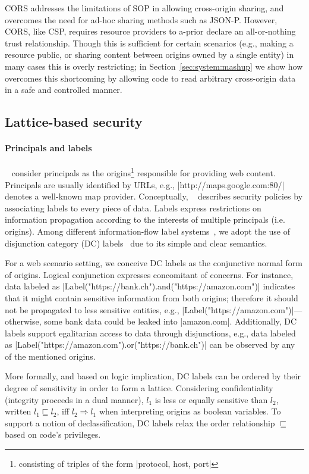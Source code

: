 CORS addresses the limitations of SOP in allowing cross-origin
sharing, and overcomes the need for ad-hoc sharing methods such as
JSON-P.
%
However, CORS, like CSP, requires resource providers to a-prior
declare an all-or-nothing trust relationship.
%
Though this is sufficient for certain scenarios (e.g., making a
resource public, or sharing content between origins owned by a single
entity) in many cases this is overly restricting;
%
in Section~\ref{sec:system:mashup} we show how \sys{} overcomes this
shortcoming by allowing code to read arbitrary cross-origin
data in a safe and controlled manner.


\subsection{Lattice-based security}

\paragraph{Principals and labels}

\sys~ consider principals as the origins\footnote{consisting of triples of the
  form \js|{protocol, host, port}|} responsible for providing web
content. Principals are usually identified by URLs, e.g., 
\js|http://maps.google.com:80/| denotes a well-known map provider.
Conceptually, \sys~ describes security policies by associating labels to every
piece of data. Labels express restrictions on information propagation according
to the interests of multiple principals (i.e. origins). Among different
information-flow label systems~\cite{GenLabels}, we adopt the use of disjunction
category (DC) labels~\cite{stefan:2011:dclabels} due to its simple and clear
semantics.

For a web scenario setting, we conceive DC labels as the conjunctive normal form
of origins. Logical conjunction expresses concomitant of concerns. For instance,
data labeled as \js|Label("https://bank.ch").and("https://amazon.com")|
indicates that it might contain sensitive information from both origins;
therefore it should not be propagated to less sensitive entities, e.g.,
\js|Label("https://amazon.com")|---otherwise, some bank data could be leaked
into \js|amazon.com|. Additionally, DC labels support egalitarian access to data
through disjunctions, e.g., data labeled as 
\js|Label("https://amazon.com").or("https://bank.ch")| can be
observed by any of the mentioned origins. 

More formally, and based on logic implication, DC labels can be ordered by their
degree of sensitivity in order to form a lattice. Considering confidentiality
(integrity proceeds in a dual manner), $l_1$ is less or equally sensitive than
$l_2$, written $l_1 \sqsubseteq l_2$, iff $l_2 \Rightarrow l_1$ when
interpreting origins as boolean variables. To support a notion of 
declassification, DC labels relax the order relationship $\sqsubseteq$ based
on code's privileges.  


